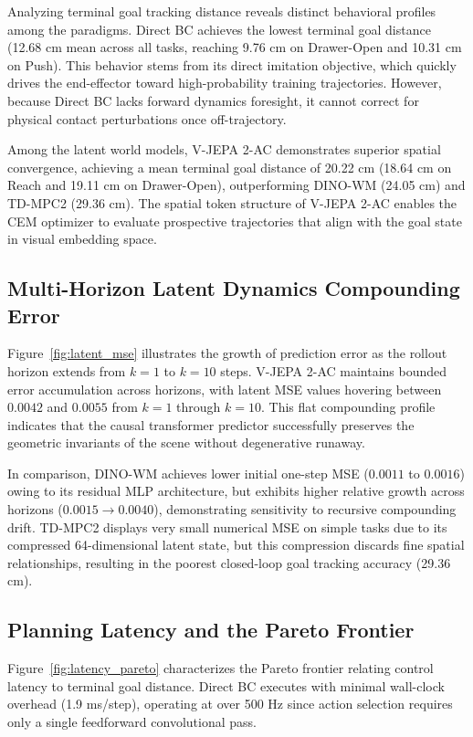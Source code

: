 \documentclass[10pt,journal,compsoc]{IEEEtran}
\begin{document}
Analyzing terminal goal tracking distance reveals distinct behavioral profiles among the paradigms. Direct BC achieves the lowest terminal goal distance (12.68 cm mean across all tasks, reaching 9.76 cm on Drawer-Open and 10.31 cm on Push). This behavior stems from its direct imitation objective, which quickly drives the end-effector toward high-probability training trajectories. However, because Direct BC lacks forward dynamics foresight, it cannot correct for physical contact perturbations once off-trajectory.

Among the latent world models, V-JEPA 2-AC demonstrates superior spatial convergence, achieving a mean terminal goal distance of 20.22 cm (18.64 cm on Reach and 19.11 cm on Drawer-Open), outperforming DINO-WM (24.05 cm) and TD-MPC2 (29.36 cm). The spatial token structure of V-JEPA 2-AC enables the CEM optimizer to evaluate prospective trajectories that align with the goal state in visual embedding space.

\subsection{Multi-Horizon Latent Dynamics Compounding Error}

Figure~\ref{fig:latent_mse} illustrates the growth of prediction error as the rollout horizon extends from $k=1$ to $k=10$ steps. V-JEPA 2-AC maintains bounded error accumulation across horizons, with latent MSE values hovering between $0.0042$ and $0.0055$ from $k=1$ through $k=10$. This flat compounding profile indicates that the causal transformer predictor successfully preserves the geometric invariants of the scene without degenerative runaway.

In comparison, DINO-WM achieves lower initial one-step MSE ($0.0011$ to $0.0016$) owing to its residual MLP architecture, but exhibits higher relative growth across horizons ($0.0015 \to 0.0040$), demonstrating sensitivity to recursive compounding drift. TD-MPC2 displays very small numerical MSE on simple tasks due to its compressed 64-dimensional latent state, but this compression discards fine spatial relationships, resulting in the poorest closed-loop goal tracking accuracy (29.36 cm).

\subsection{Planning Latency and the Pareto Frontier}

Figure~\ref{fig:latency_pareto} characterizes the Pareto frontier relating control latency to terminal goal distance. Direct BC executes with minimal wall-clock overhead (1.9 ms/step), operating at over 500 Hz since action selection requires only a single feedforward convolutional pass.
\end{document}
